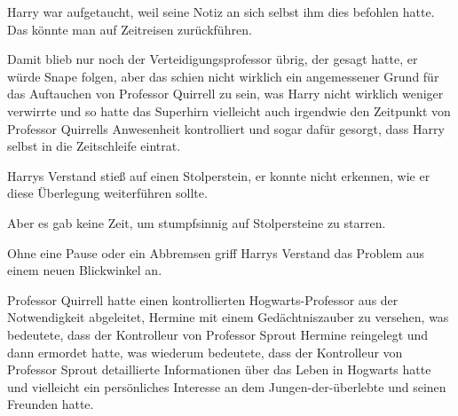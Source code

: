 Harry war aufgetaucht, weil seine Notiz an sich selbst ihm dies befohlen hatte.
Das könnte man auf Zeitreisen zurückführen.

Damit blieb nur noch der Verteidigungsprofessor übrig, der gesagt hatte, er würde Snape folgen, aber das schien nicht wirklich ein angemessener Grund für das Auftauchen von Professor Quirrell zu sein, was Harry nicht wirklich weniger verwirrte und so hatte das Superhirn vielleicht auch irgendwie den Zeitpunkt von Professor Quirrells Anwesenheit kontrolliert und sogar dafür gesorgt, dass Harry selbst in die Zeitschleife eintrat.

Harrys Verstand stieß auf einen Stolperstein, er konnte nicht erkennen, wie er diese Überlegung weiterführen sollte.

Aber es gab keine Zeit, um stumpfsinnig auf Stolpersteine zu starren.

Ohne eine Pause oder ein Abbremsen griff Harrys Verstand das Problem aus einem neuen Blickwinkel an.

Professor Quirrell hatte einen kontrollierten Hogwarts-Professor aus der Notwendigkeit abgeleitet, Hermine mit einem Gedächtniszauber zu versehen, was bedeutete, dass der Kontrolleur von Professor Sprout Hermine reingelegt und dann ermordet hatte, was wiederum bedeutete, dass der Kontrolleur von Professor Sprout detaillierte Informationen über das Leben in Hogwarts hatte und vielleicht ein persönliches Interesse an dem Jungen-der-überlebte und seinen Freunden hatte.

